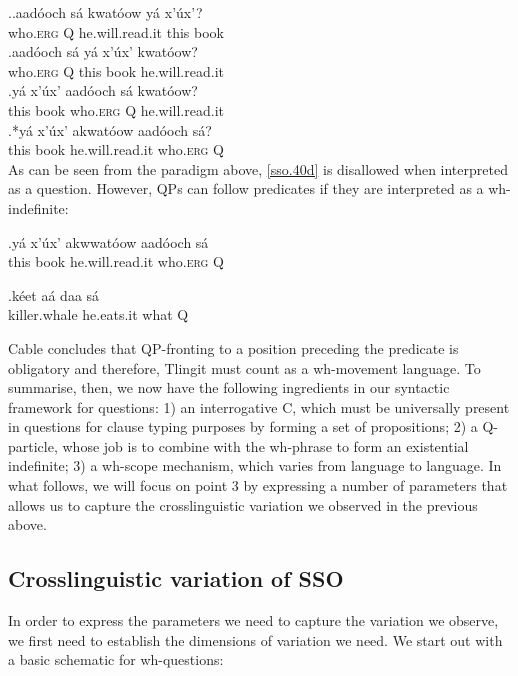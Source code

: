 \documentclass{glossa}
\begin{document}
\ex.\ag.aad\'ooch s\'a kwat\'oow y\'a x'\'ux'?\\
   who.\textsc{erg} Q he.will.read.it this book\\
   \bg.aad\'ooch s\'a y\'a x'\'ux' kwat\'oow?\\
   who.\textsc{erg} Q this book he.will.read.it\\
   \bg.y\'a x'\'ux' aad\'ooch s\'a kwat\'oow?\\
   this book  who.\textsc{erg} Q he.will.read.it\\
   \bg.*\label{sso.40d}y\'a x'\'ux' akwat\'oow aad\'ooch s\'a?\\
   this book he.will.read.it who.\textsc{erg} Q\\

As can be seen from the paradigm above, \ref{sso.40d} is disallowed when interpreted as a question. However, QPs can follow predicates if they are interpreted as a wh-indefinite:

\exg.\label{sso.50}y\'a x'\'ux' akwwat\'oow aad\'ooch s\'a\\
   this book he.will.read.it who.\textsc{erg} Q\\

\exg.\label{sso.60}k\'eet a\'a daa s\'a\\
   killer.whale he.eats.it what Q\\

Cable concludes that QP-fronting to a position preceding the predicate is obligatory and therefore, Tlingit must count as a wh-movement language. To summarise, then, we now have the following ingredients in our syntactic framework for questions: 1) an interrogative C, which must be universally present in questions for clause typing purposes by forming a set of propositions; 2) a Q-particle, whose job is to combine with the wh-phrase to form an existential indefinite; 3) a wh-scope mechanism, which varies from language to language. In what follows, we will focus on point 3 by expressing a number of parameters that allows us to capture the crosslinguistic variation we observed in the previous above.

\subsection{Crosslinguistic variation of SSO}
In order to express the parameters we need to capture the variation we observe, we first need to establish the dimensions of variation we need. We start out with a basic schematic for wh-questions:
\end{document}
